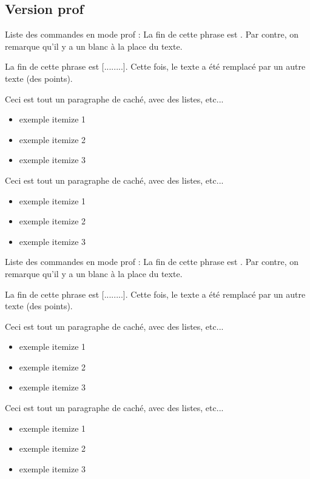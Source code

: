 \documentclass[a4paper,12pt]{article}
\begin{document}
	\subsection{Version prof}

\begin{code}
Liste des commandes en mode prof :
La fin de cette phrase est . Par contre, on remarque qu'il y a un blanc à la place du texte.

La fin de cette phrase est [........]. Cette fois, le texte a été remplacé par un autre texte (des points).

\begin{bigReponse}
	Ceci est tout un paragraphe de caché,
	avec des listes, etc...
	\begin{itemize}
		\item exemple itemize 1
		\item exemple itemize 2
		\item exemple itemize 3
	\end{itemize}
\end{bigReponse}
\begin{bigReponse}
	Ceci est tout un paragraphe de caché,
	avec des listes, etc...
	\begin{itemize}
		\item exemple itemize 1
		\item exemple itemize 2
		\item exemple itemize 3
	\end{itemize}
\end{bigReponse}

\end{code}


Liste des commandes en mode prof :
La fin de cette phrase est . Par contre, on remarque qu'il y a un blanc à la place du texte.

La fin de cette phrase est [........]. Cette fois, le texte a été remplacé par un autre texte (des points).

\begin{bigReponse}
	Ceci est tout un paragraphe de caché,
	avec des listes, etc...
	\begin{itemize}
		\item exemple itemize 1
		\item exemple itemize 2
		\item exemple itemize 3
	\end{itemize}
\end{bigReponse}
\begin{bigReponse}
	Ceci est tout un paragraphe de caché,
	avec des listes, etc...
	\begin{itemize}
		\item exemple itemize 1
		\item exemple itemize 2
		\item exemple itemize 3
	\end{itemize}
\end{bigReponse}
\end{document}
